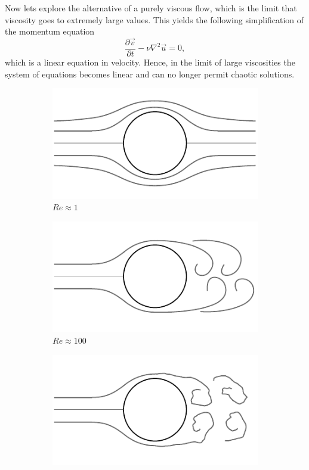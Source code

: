 Now lets explore the alternative of a purely viscous flow, which is the limit that viscosity goes to extremely large values. This yields the following simplification of the momentum equation
\begin{equation}
	\frac{\partial \vec{v}}{\partial t} - \nu \nabla^2 \vec{u} = 0,
\end{equation}
which is a linear equation in velocity. Hence, in the limit of large viscosities the system of equations becomes linear and can no longer permit chaotic solutions.
\begin{figure}[tbp]
	\centering
	\begin{subfigure}[b]{0.40\textwidth}
		\includegraphics[width=\linewidth]{Pictures/cylinder_1}
		\caption{$Re\approx1$}
	\end{subfigure}
	\begin{subfigure}[b]{0.40\textwidth}
		\includegraphics[width=\linewidth]{Pictures/cylinder_2}
		\caption{$Re\approx100$}
	\end{subfigure}
	\begin{subfigure}[b]{0.40\textwidth}
		\includegraphics[width=\linewidth]{Pictures/cylinder_3}

\end{subfigure}
\end{figure}
